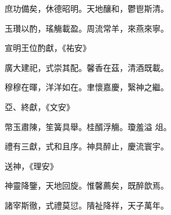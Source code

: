 \begin{pinyinscope}
 庶功備矣，休德昭明。天地釀和，鬱鬯斯清。



 玉瓚以酌，瑤觴載盈。周流常羊，來燕來寧。



 宣明王位酌獻，《祐安》



 廣大建祀，式崇其配。馨香在茲，清酒既載。



 穆穆在暉，洋洋如在。聿懷嘉慶，繄神之繼。



 亞、終獻，《文安》



 幣玉肅陳，笙簧具舉。桂醑浮觴。瓊羞溢
 俎。



 禮有三獻，式和且序。神具醉止，慶流寰宇。



 送神，《理安》



 神靈降鑒，天地回旋。惟馨薦矣，既醉歆焉。



 諸宰斯徹，式禮莫愆。隤祉降祥，天子萬年。



\end{pinyinscope}